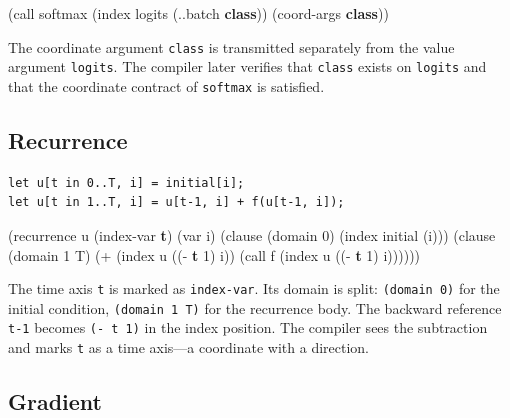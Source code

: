 \documentclass[11pt,titlepage]{article}
\newenvironment{Shaded}{}{}
\newcommand{\DecValTok}[1]{\textcolor[rgb]{0.25,0.63,0.44}{#1}}
\newcommand{\KeywordTok}[1]{\textcolor[rgb]{0.00,0.44,0.13}{\textbf{#1}}}
\newcommand{\NormalTok}[1]{#1}
\newcommand{\OperatorTok}[1]{\textcolor[rgb]{0.40,0.40,0.40}{#1}}
\begin{document}
\begin{Shaded}
\begin{Highlighting}[]
\NormalTok{(call softmax (index logits (..batch }\KeywordTok{class}\NormalTok{))}
\NormalTok{  (coord-args }\KeywordTok{class}\NormalTok{))}
\end{Highlighting}
\end{Shaded}

The coordinate argument \texttt{class} is transmitted separately from
the value argument \texttt{logits}. The compiler later verifies that
\texttt{class} exists on \texttt{logits} and that the coordinate
contract of \texttt{softmax} is satisfied.

\vspace{2em}

\hypertarget{recurrence}{%
\subsection{Recurrence}\label{recurrence}}

\begin{verbatim}
let u[t in 0..T, i] = initial[i];
let u[t in 1..T, i] = u[t-1, i] + f(u[t-1, i]);
\end{verbatim}

\begin{Shaded}
\begin{Highlighting}[]
\NormalTok{(recurrence u (index-var }\KeywordTok{t}\NormalTok{) (var i)}
\NormalTok{  (clause (domain }\DecValTok{0}\NormalTok{) (index initial (i)))}
\NormalTok{  (clause (domain }\DecValTok{1}\NormalTok{ T)}
\NormalTok{    (}\OperatorTok{+}\NormalTok{ (index u ((}\OperatorTok{-} \KeywordTok{t} \DecValTok{1}\NormalTok{) i))}
\NormalTok{       (call f (index u ((}\OperatorTok{-} \KeywordTok{t} \DecValTok{1}\NormalTok{) i))))))}
\end{Highlighting}
\end{Shaded}

The time axis \texttt{t} is marked as \texttt{index-var}. Its domain is
split: \texttt{(domain\ 0)} for the initial condition,
\texttt{(domain\ 1\ T)} for the recurrence body. The backward reference
\texttt{t-1} becomes \texttt{(-\ t\ 1)} in the index position. The
compiler sees the subtraction and marks \texttt{t} as a time axis---a
coordinate with a direction.

\vspace{2em}

\hypertarget{gradient}{%
\subsection{Gradient}\label{gradient}}
\end{document}
